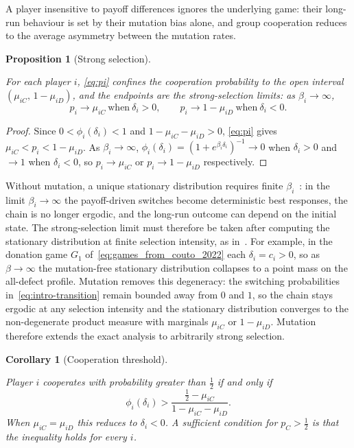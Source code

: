 \documentclass[11pt]{article}
\newtheorem{proposition}{Proposition}
\newtheorem{corollary}{Corollary}
\newcommand{\pC}{p_C}
\begin{document}
A player insensitive to payoff differences ignores the underlying game: their long-run
behaviour is set by their mutation bias alone, and group cooperation reduces to the
average asymmetry between the mutation rates.

\begin{proposition}[Strong selection]\label{prop:strong}

For each player \(i\), \eqref{eq:pi} confines the cooperation probability to the open
interval \((\mu_{iC},\,1-\mu_{iD})\), and the endpoints are the strong-selection limits:
as \(\beta_i\to\infty\),
\[
  p_i \to \mu_{iC} \ \text{when}\ \delta_i>0, \qquad
  p_i \to 1-\mu_{iD} \ \text{when}\ \delta_i<0.
\]

\end{proposition}

\begin{proof}

Since \(0<\phi_i(\delta_i)<1\) and \(1-\mu_{iC}-\mu_{iD}>0\), \eqref{eq:pi} gives
\(\mu_{iC}<p_i<1-\mu_{iD}\). As \(\beta_i\to\infty\),
\(\phi_i(\delta_i)=(1+e^{\beta_i\delta_i})^{-1}\to0\) when \(\delta_i>0\) and \(\to1\)
when \(\delta_i<0\), so \(p_i\to\mu_{iC}\) or \(p_i\to1-\mu_{iD}\) respectively.

\end{proof}

Without mutation, a unique stationary distribution requires finite
\(\beta_i\)~\cite{couto2023multiplayer}: in the limit \(\beta_i\to\infty\) the
payoff-driven switches become deterministic best responses, the chain is no
longer ergodic, and the long-run outcome can depend on the initial state. The
strong-selection limit must therefore be taken after computing the stationary
distribution at finite selection intensity, as
in~\cite{couto2022introspection}. For example, in the donation game \(G_1\)
of~\eqref{eq:games_from_couto_2022} each \(\delta_i=c_i>0\), so as
\(\beta\to\infty\) the mutation-free stationary distribution collapses to a
point mass on the all-defect profile. Mutation removes this degeneracy: the
switching probabilities in~\eqref{eq:intro-transition} remain bounded away
from \(0\) and \(1\), so the chain stays ergodic at any selection intensity
and the stationary distribution converges to the non-degenerate product
measure with marginals \(\mu_{iC}\) or \(1-\mu_{iD}\). Mutation therefore
extends the exact analysis to arbitrarily strong selection.

\begin{corollary}[Cooperation threshold]\label{cor:threshold}

Player \(i\) cooperates with probability greater than \(\tfrac{1}{2}\) if and only if
\[
  \phi_i(\delta_i) > \frac{\tfrac{1}{2}-\mu_{iC}}{1-\mu_{iC}-\mu_{iD}}.
\]
When \(\mu_{iC}=\mu_{iD}\) this reduces to \(\delta_i<0\). A sufficient condition for
\(\pC>\tfrac{1}{2}\) is that the inequality holds for every \(i\).

\end{corollary}
\end{document}
